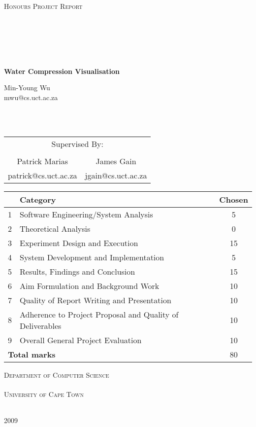 \documentclass[a4paper]{report}
\begin{document}
\begin{titlepage}
\begin{center}

\textsc{\Large Honours Project Report \\
\ \\
\ \\
\ \\
\ \\
\ \\
}

{\huge \bfseries
Water Compression Visualisation
\\}

\vfill

\large Min-Young Wu
\\
\small{mwu@cs.uct.ac.za}

\ \\
\ \\

\begin{tabular}{cc}
  \multicolumn{2}{c}{\large Supervised By:} \\
  \\
  \large Patrick Marias & \large James Gain
  \\
  \small patrick@cs.uct.ac.za & \small jgain@cs.uct.ac.za
\end{tabular}

\vfill

\begin{tabular}{|l|l|c|}
  \hline
  & \textbf{Category} & \textbf{Chosen} \\
  \hline
  1 & Software Engineering/System Analysis & 5 \\
  \hline
  2 & Theoretical Analysis & 0 \\
  \hline
  3 & Experiment Design and Execution & 15 \\
  \hline
  4 & System Development and Implementation & 5 \\
  \hline
  5 & Results, Findings and Conclusion & 15 \\
  \hline
  6 & Aim Formulation and Background Work & 10 \\
  \hline
  7 & Quality of Report Writing and Presentation & 10 \\
  \hline
  8 & Adherence to Project Proposal and Quality of Deliverables & 10 \\
  \hline
  9 & Overall General Project Evaluation & 10 \\
  \hline
  \multicolumn{2}{|l|}{\textbf{Total marks}} & 80 \\
  \hline
\end{tabular}

\vfill

\textsc{\Large Department of Computer Science \\
\ \\
University of Cape Town \\
\ \\}

{\large 2009}

\end{center}
\end{titlepage}
\end{document}
